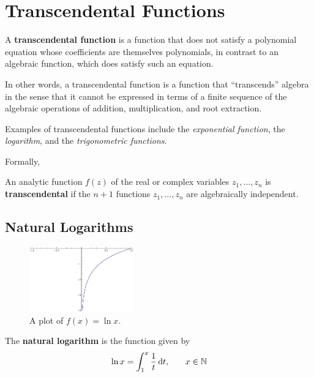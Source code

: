 \chapter{Transcendental Functions}

A \textbf{transcendental function} is a function that does not satisfy a polynomial equation whose coefficients are themselves polynomials, in contrast to an algebraic function, which does satisfy such an equation.

In other words, a transcendental function is a function that ``transcends'' algebra in the sense that it cannot be expressed in terms of a finite sequence of the algebraic operations of addition, multiplication, and root extraction.

Examples of transcendental functions include the \emph{exponential function}, the \emph{logarithm}, and the \emph{trigonometric functions}.

Formally,

\begin{defn}
  An analytic function \(f(z)\) of the real or complex variables \(z_1, \ldots, z_n\) is \textbf{transcendental} if the \(n+1\) functions \(z_1, \ldots, z_n\) are algebraically independent.
  \cite{wiki:transcendental}
\end{defn}

\section{Natural Logarithms}
\begin{figure}[h]
  \begin{center}
    \includegraphics[width=0.4\textwidth]{continuous/transcend/natlog.eps}
  \end{center}
  \caption{A plot of $f(x) =\ln x$.}
  \label{fig:natlog}
\end{figure}

\begin{defn}
  The \textbf{natural logarithm} is the function given by
  \begin{equation}
    \ln x = \int ^{x} _{1} \frac{1}{t} \,\mathrm{d} t \text{,} \qquad x \in \mathbb{N}
  \end{equation}
\end{defn}

